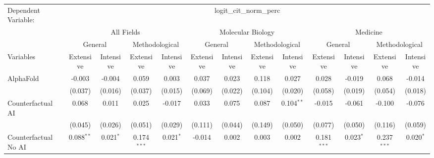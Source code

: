 \begingroup
\centering
\begin{tabular}{lcccccccccccc}
   \tabularnewline \midrule \midrule
   Dependent Variable: & \multicolumn{12}{c}{logit\_cit\_norm\_perc}\\
 & \multicolumn{4}{c}{All Fields} & \multicolumn{4}{c}{Molecular Biology} & \multicolumn{4}{c}{Medicine} \\
\cmidrule(lr){2-5} \cmidrule(lr){6-9} \cmidrule(lr){10-13}
 & \multicolumn{2}{c}{General} & \multicolumn{2}{c}{Methodological} & \multicolumn{2}{c}{General} & \multicolumn{2}{c}{Methodological} & \multicolumn{2}{c}{General} & \multicolumn{2}{c}{Methodological} \\
\cmidrule(lr){2-3} \cmidrule(lr){4-5} \cmidrule(lr){6-7} \cmidrule(lr){8-9} \cmidrule(lr){10-11} \cmidrule(lr){12-13}
Variables & \multicolumn{1}{c}{Extensive} & \multicolumn{1}{c}{Intensive} & \multicolumn{1}{c}{Extensive} & \multicolumn{1}{c}{Intensive} & \multicolumn{1}{c}{Extensive} & \multicolumn{1}{c}{Intensive} & \multicolumn{1}{c}{Extensive} & \multicolumn{1}{c}{Intensive} & \multicolumn{1}{c}{Extensive} & \multicolumn{1}{c}{Intensive} & \multicolumn{1}{c}{Extensive} & \multicolumn{1}{c}{Intensive} \\
\cmidrule(lr){1-1}\cmidrule(lr){2-2} \cmidrule(lr){3-3} \cmidrule(lr){4-4} \cmidrule(lr){5-5} \cmidrule(lr){6-6} \cmidrule(lr){7-7} \cmidrule(lr){8-8} \cmidrule(lr){9-9} \cmidrule(lr){10-10} \cmidrule(lr){11-11} \cmidrule(lr){12-12} \cmidrule(lr){13-13}
   AlphaFold                                & -0.003       & -0.004      & 0.059         & 0.003       & 0.037   & 0.023   & 0.118   & 0.027         & 0.028         & -0.019      & 0.068         & -0.014\\   
                                            & (0.037)      & (0.016)     & (0.037)       & (0.015)     & (0.069) & (0.022) & (0.104) & (0.020)       & (0.058)       & (0.019)     & (0.054)       & (0.018)\\   
   Counterfactual AI                        & 0.068        & 0.011       & 0.025         & -0.017      & 0.033   & 0.075   & 0.087   & 0.104$^{**}$  & -0.015        & -0.061      & -0.100        & -0.076\\   
                                            & (0.045)      & (0.026)     & (0.051)       & (0.029)     & (0.111) & (0.044) & (0.149) & (0.050)       & (0.077)       & (0.050)     & (0.116)       & (0.059)\\   
   Counterfactual No AI                     & 0.088$^{**}$ & 0.021$^{*}$ & 0.174$^{***}$ & 0.021$^{*}$ & -0.014  & 0.002   & 0.003   & 0.002         & 0.181$^{***}$ & 0.023$^{*}$ & 0.237$^{***}$ & 0.020$^{*}$\\   

\end{tabular}
